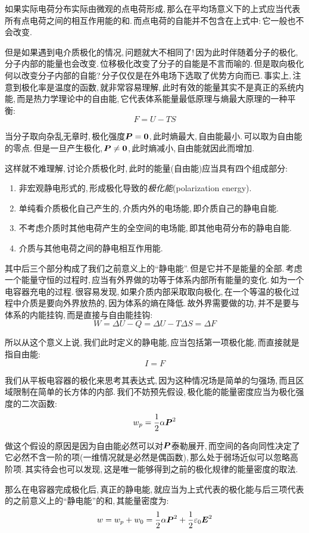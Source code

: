 如果实际电荷分布实际由微观的点电荷形成,\,那么在平均场意义下的上式应当代表所有点电荷之间的相互作用能的和.\,而点电荷的自能并不包含在上式中:\,它一般也不会改变.

但是如果遇到电介质极化的情况,\,问题就大不相同了!\,因为此时伴随着分子的极化,\,分子内部的能量也会改变.\,位移极化改变了分子的自能是不言而喻的.\,但是取向极化何以改变分子内部的自能?\,分子仅仅是在外电场下选取了优势方向而已.\,事实上,\,注意到极化率是温度的函数,\,就非常容易理解,\,此时有效的能量其实不是真正的系统内能,\,而是热力学理论中的自由能,\,它代表体系能量最低原理与熵最大原理的一种平衡:
\[F=U-TS\]

当分子取向杂乱无章时,\,极化强度$\boldsymbol{P}=\boldsymbol{0}$,\,此时熵最大,\,自由能最小.\,可以取为自由能的零点.\,但是一旦产生极化,\,$\boldsymbol{P}\neq\boldsymbol{0}$,\,此时熵减小,\,自由能就因此而增加.

这样就不难理解,\,讨论介质极化时,\,此时的能量(自由能)应当具有四个组成部分:
\begin{enumerate}
	\item 非宏观静电形式的,\,形成极化导致的\emph{极化能}(polarization energy).
	\item 单纯看介质极化自己产生的,\,介质内外的电场能,\,即介质自己的静电自能.
	\item 不考虑介质时其他电荷产生的全空间的电场能,\,即其他电荷分布的静电自能.
	\item 介质与其他电荷之间的静电相互作用能.
\end{enumerate}

其中后三个部分构成了我们之前意义上的``静电能''.\,但是它并不是能量的全部.\,考虑一个能量守恒的过程时,\,应当有外界做的功等于体系内部所有能量的变化.\,如为一个电容器充电的过程.\,很容易发现,\,如果介质内部采取取向极化,\,在一个等温的极化过程中介质是要向外界放热的,\,因为体系的熵在降低.\,故外界需要做的功,\,并不是要与体系的内能挂钩,\,而是直接与自由能挂钩:
\[W=\Delta U-Q=\Delta U-T\Delta S=\Delta F\]

所以从这个意义上说,\,我们此时定义的静电能,\,应当包括第一项极化能,\,而直接就是指自由能:
\[I=F\]

我们从平板电容器的极化来思考其表达式,\,因为这种情况场是简单的匀强场,\,而且区域限制在简单的长方体的内部.\,我们不妨预先假设,\,极化能的能量密度应当为极化强度的二次函数:
\[w_p=\frac{1}{2}\alpha \boldsymbol{P}^2\]

做这个假设的原因是因为自由能必然可以对$\boldsymbol{P}$泰勒展开,\,而空间的各向同性决定了它必然不含一阶的项(一维情况就是必然是偶函数),\,那么处于弱场近似可以忽略高阶项.\,其实待会也可以发现,\,这是唯一能够得到之前的极化规律的能量密度的取法.

那么在电容器完成极化后,\,真正的静电能,\,就应当为上式代表的极化能与后三项代表的之前意义上的``静电能''的和,\,其能量密度为:
\[w=w_p+w_0=\frac{1}{2}\alpha \boldsymbol{P}^2+\frac{1}{2}\varepsilon_0 \boldsymbol{E}^2\]

